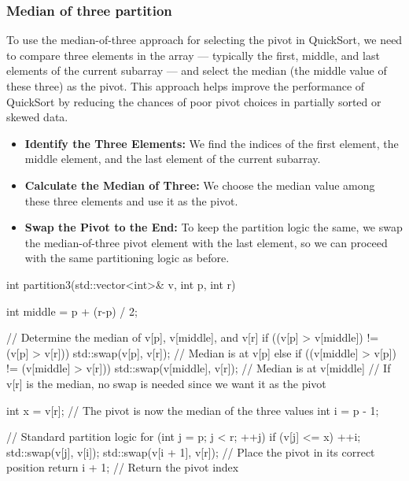 \documentclass{report}
\begin{document}
\subsubsection{Median of three partition}
\bigbreak \noindent 
To use the median-of-three approach for selecting the pivot in QuickSort, we need to compare three elements in the array — typically the first, middle, and last elements of the current subarray — and select the median (the middle value of these three) as the pivot. This approach helps improve the performance of QuickSort by reducing the chances of poor pivot choices in partially sorted or skewed data.
\begin{itemize}
    \item \textbf{Identify the Three Elements:} We find the indices of the first element, the middle element, and the last element of the current subarray.
    \item \textbf{Calculate the Median of Three:} We choose the median value among these three elements and use it as the pivot.
    \item \textbf{Swap the Pivot to the End:} To keep the partition logic the same, we swap the median-of-three pivot element with the last element, so we can proceed with the same partitioning logic as before.
\end{itemize}
\bigbreak \noindent 
\begin{cppcode}
    int partition3(std::vector<int>& v, int p, int r) {
        int middle = p + (r-p) / 2;

        // Determine the median of v[p], v[middle], and v[r]
        if ((v[p] > v[middle]) != (v[p] > v[r])) {
            std::swap(v[p], v[r]); // Median is at v[p]
        } else if ((v[middle] > v[p]) != (v[middle] > v[r])) {
            std::swap(v[middle], v[r]); // Median is at v[middle]
        } 
        // If v[r] is the median, no swap is needed since we want it as the pivot

        int x = v[r]; // The pivot is now the median of the three values
        int i = p - 1;

        // Standard partition logic
        for (int j = p; j < r; ++j) {
            if (v[j] <= x) {
                ++i;
                std::swap(v[j], v[i]);
            }
        }
        std::swap(v[i + 1], v[r]); // Place the pivot in its correct position
        return i + 1; // Return the pivot index
    }
\end{cppcode}

\pagebreak 
\bigbreak \noindent 
\end{document}
